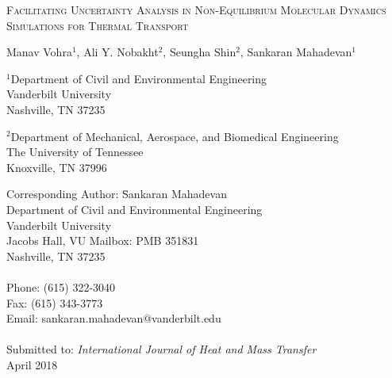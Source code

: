 \begin{center}
\textsc{
Facilitating Uncertainty Analysis in Non-Equilibrium Molecular Dynamics Simulations for
Thermal Transport
}

\bigskip 
\bigskip 

Manav Vohra$^{1}$, Ali Y. Nobakht$^{2}$, Seungha Shin$^{2}$, Sankaran Mahadevan$^{1}$

\bigskip
\bigskip

\normalsize
$^1$Department of Civil and Environmental Engineering\\
Vanderbilt University\\
Nashville, TN 37235\\

\bigskip

$^2$Department of Mechanical, Aerospace, and Biomedical Engineering\\
The University of Tennessee\\
Knoxville, TN 37996\\

\bigskip

\end{center}

\vspace{6cm}

\begin{tabbing}
Corresponding Author: \hspace{5mm} \= Sankaran Mahadevan\\
       \>  Department of Civil and Environmental Engineering\\
       \>  Vanderbilt University\\
        Jacobs Hall, VU Mailbox: PMB 351831 \\
       \>  Nashville, TN 37235 \\
       \> \\
Phone: \> (615) 322-3040 \\
Fax:   \> (615) 343-3773 \\
Email: \>  sankaran.mahadevan@vanderbilt.edu   \\
\\
Submitted to: \> \textit{International Journal of Heat and Mass Transfer} \\
\>  April 2018\\

\bigskip
\end{tabbing}

\clearpage

